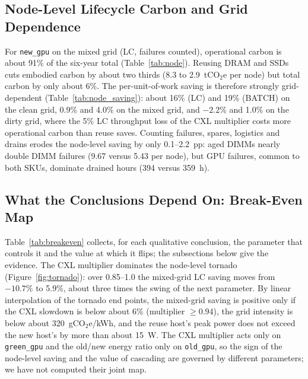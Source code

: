 \documentclass{article} %
\begin{document}
\subsection{Node-Level Lifecycle Carbon and Grid Dependence}
\label{sec:node}
For \texttt{new\_gpu} on the mixed grid (LC, failures counted), operational carbon is about 91\% of the six-year total (Table~\ref{tab:node}). Reusing DRAM and SSDs cuts embodied carbon by about two thirds (8.3 to 2.9~tCO$_2$e per node) but total carbon by only about 6\%. The per-unit-of-work saving is therefore strongly grid-dependent (Table~\ref{tab:node_saving}): about 16\% (LC) and 19\% (BATCH) on the clean grid, 0.9\% and 4.0\% on the mixed grid, and $-2.2\%$ and 1.0\% on the dirty grid, where the 5\% LC throughput loss of the CXL multiplier costs more operational carbon than reuse saves. Counting failures, spares, logistics and drains erodes the node-level saving by only 0.1--2.2~pp: aged DIMMs nearly double DIMM failures (9.67 versus 5.43 per node), but GPU failures, common to both SKUs, dominate drained hours (394 versus 359~h).

\subsection{What the Conclusions Depend On: Break-Even Map}
\label{sec:breakeven}
Table~\ref{tab:breakeven} collects, for each qualitative conclusion, the parameter that controls it and the value at which it flips; the subsections below give the evidence. The CXL multiplier dominates the node-level tornado (Figure~\ref{fig:tornado}): over 0.85--1.0 the mixed-grid LC saving moves from $-10.7\%$ to 5.9\%, about three times the swing of the next parameter. By linear interpolation of the tornado end points, the mixed-grid saving is positive only if the CXL slowdown is below about 6\% (multiplier $\geq 0.94$), the grid intensity is below about 320~gCO$_2$e/kWh, and the reuse host's peak power does not exceed the new host's by more than about 15~W. The CXL multiplier acts only on \texttt{green\_gpu} and the old/new energy ratio only on \texttt{old\_gpu}, so the sign of the node-level saving and the value of cascading are governed by different parameters; we have not computed their joint map.
\end{document}

